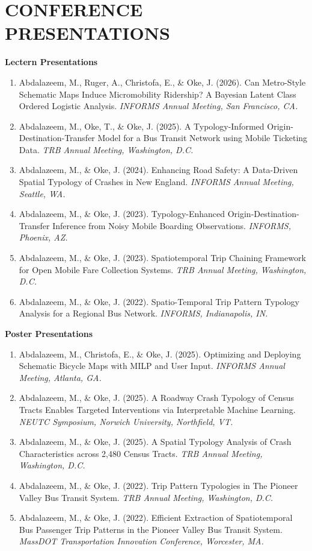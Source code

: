 \documentclass[10pt, a4paper]{article}
\newenvironment{publist}{%
  \begin{enumerate}[leftmargin=1.8em, label=\arabic*., itemsep=3pt, topsep=2pt]
}{%
  \end{enumerate}
}
\begin{document}
\section{CONFERENCE PRESENTATIONS}

\textbf{Lectern Presentations}
\begin{publist}
  \item Abdalazeem, M., Ruger, A., Christofa, E., \& Oke, J. (2026). Can Metro-Style Schematic Maps Induce Micromobility Ridership? A Bayesian Latent Class Ordered Logistic Analysis. \textit{INFORMS Annual Meeting, San Francisco, CA.}
  \item Abdalazeem, M., Oke, T., \& Oke, J. (2025). A Typology-Informed Origin-Destination-Transfer Model for a Bus Transit Network using Mobile Ticketing Data. \textit{TRB Annual Meeting, Washington, D.C.}
  \item Abdalazeem, M., \& Oke, J. (2024). Enhancing Road Safety: A Data-Driven Spatial Typology of Crashes in New England. \textit{INFORMS Annual Meeting, Seattle, WA.}
  \item Abdalazeem, M., \& Oke, J. (2023). Typology-Enhanced Origin-Destination-Transfer Inference from Noisy Mobile Boarding Observations. \textit{INFORMS, Phoenix, AZ.}
  \item Abdalazeem, M., \& Oke, J. (2023). Spatiotemporal Trip Chaining Framework for Open Mobile Fare Collection Systems. \textit{TRB Annual Meeting, Washington, D.C.}
  \item Abdalazeem, M., \& Oke, J. (2022). Spatio-Temporal Trip Pattern Typology Analysis for a Regional Bus Network. \textit{INFORMS, Indianapolis, IN.}
\end{publist}

\vspace{6pt}
\textbf{Poster Presentations}
\begin{publist}
  \item Abdalazeem, M., Christofa, E., \& Oke, J. (2025). Optimizing and Deploying Schematic Bicycle Maps with MILP and User Input. \textit{INFORMS Annual Meeting, Atlanta, GA.}
  \item Abdalazeem, M., \& Oke, J. (2025). A Roadway Crash Typology of Census Tracts Enables Targeted Interventions via Interpretable Machine Learning. \textit{NEUTC Symposium, Norwich University, Northfield, VT.}
  \item Abdalazeem, M., \& Oke, J. (2025). A Spatial Typology Analysis of Crash Characteristics across 2,480 Census Tracts. \textit{TRB Annual Meeting, Washington, D.C.}
  \item Abdalazeem, M., \& Oke, J. (2022). Trip Pattern Typologies in The Pioneer Valley Bus Transit System. \textit{TRB Annual Meeting, Washington, D.C.}
  \item Abdalazeem, M., \& Oke, J. (2022). Efficient Extraction of Spatiotemporal Bus Passenger Trip Patterns in the Pioneer Valley Bus Transit System. \textit{MassDOT Transportation Innovation Conference, Worcester, MA.}
\end{publist}
\end{document}
